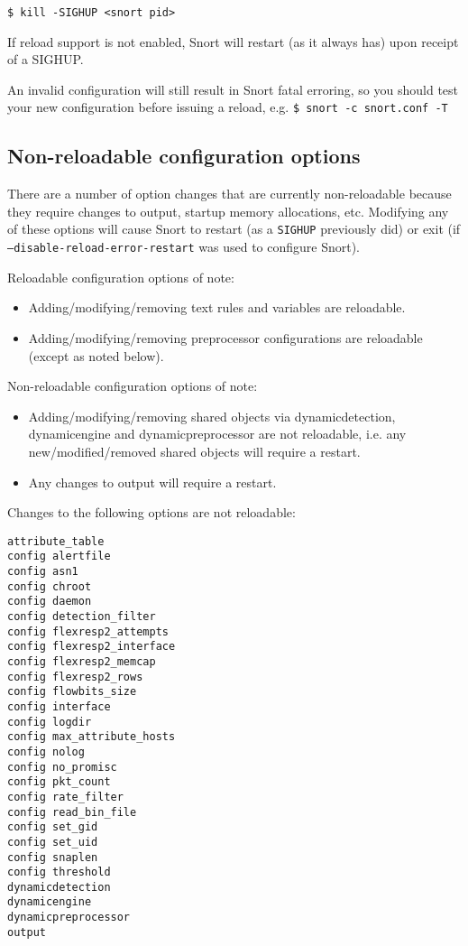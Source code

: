 \documentclass[english]{report}
\newenvironment{note}{
\samepage
    \vspace{10pt}{\textsf{
        {\hspace{7pt}\Huge{$\triangle$\hspace{-12.5pt}{\Large{$^!$}}}}\hspace{5pt}
        {\Large{NOTE}}
    }
    }
   \begin{center}
    \par\vspace{-17pt}

    \begin{lrbox}{\savepar}
    \begin{minipage}[r]{6in}
}
{
    \end{minipage}
    \end{lrbox}
    \fbox{
        \usebox{
            \savepar
	}
    }
    \par\vskip10pt
    \end{center}
}
\newenvironment{note}{
        \begin{rawhtml}
        <p><table border="1"><tr><td><b>
        Note:&nbsp;&nbsp;</b>
        \end{rawhtml}
}{
        \begin{rawhtml}
        </b></td></tr></table></p>
        \end{rawhtml}
}
\begin{document}
\begin{verbatim}
$ kill -SIGHUP <snort pid>
\end{verbatim}

\begin{note}
If reload support is not enabled, Snort will restart (as it always has)
upon receipt of a SIGHUP.
\end{note}

\begin{note}
An invalid configuration will still result in Snort fatal erroring, so
you should test your new configuration before issuing a reload, e.g.
\texttt{\$ snort -c snort.conf -T}
\end{note}


\subsection{Non-reloadable configuration options}
\label{reload:nonreloadable}
There are a number of option changes that are currently non-reloadable because
they require changes to output, startup memory allocations, etc.  Modifying any
of these options will cause Snort to restart (as a \texttt{SIGHUP} previously did) or
exit (if \texttt{--disable-reload-error-restart} was used to configure Snort).

Reloadable configuration options of note:
\begin{itemize}
\item Adding/modifying/removing text rules and variables are reloadable.
\item Adding/modifying/removing preprocessor configurations are reloadable (except
  as noted below).
\end{itemize}

Non-reloadable configuration options of note:
\begin{itemize}
\item Adding/modifying/removing shared objects via dynamicdetection, dynamicengine
  and dynamicpreprocessor are not reloadable, i.e. any new/modified/removed
  shared objects will require a restart.
\item Any changes to output will require a restart.
\end{itemize}

Changes to the following options are not reloadable:

\begin{verbatim}
attribute_table
config alertfile
config asn1
config chroot
config daemon
config detection_filter
config flexresp2_attempts
config flexresp2_interface
config flexresp2_memcap
config flexresp2_rows
config flowbits_size
config interface
config logdir
config max_attribute_hosts
config nolog
config no_promisc
config pkt_count
config rate_filter
config read_bin_file
config set_gid
config set_uid
config snaplen
config threshold
dynamicdetection
dynamicengine
dynamicpreprocessor
output
\end{verbatim}
\end{document}
